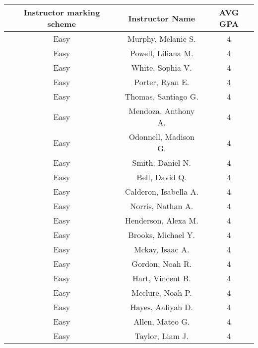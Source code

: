 


\begin{center}
\begin{tabular}{|c|c|c|}
\hline
Instructor marking scheme & Instructor Name  & AVG GPA \\ \hline
Easy     & Murphy, Melanie S.                             & 4        \\ \hline
Easy     & Powell, Liliana M.                           &4        \\ \hline
Easy     &  White, Sophia V.                        &4 \\ \hline
Easy     & Porter, Ryan E.                          &4    \\ \hline
Easy     & Thomas, Santiago G.                       &4      \\ \hline
Easy     & Mendoza, Anthony A.                        &4         \\ \hline
Easy     & Odonnell, Madison G.                     &4              \\ \hline
Easy     & Smith, Daniel N.                          &4       \\ \hline
Easy     & Bell, David Q.                          &4\\ \hline
Easy       &Calderon, Isabella A.                      &4             \\ \hline
Easy       & Norris, Nathan A.                          &4           \\ \hline
Easy       & Henderson, Alexa M.                      &4           \\ \hline
Easy       & Brooks, Michael Y.                        &4        \\ \hline
Easy       & Mckay, Isaac A.                            &4    \\ \hline
Easy       & Gordon, Noah R.                          &4         \\ \hline
Easy       & Hart, Vincent B.                          &4       \\ \hline
Easy       & Mcclure, Noah P.                           &4                                 \\ \hline
Easy       & Hayes, Aaliyah D.                          &4          \\ \hline
Easy       & Allen, Mateo G.                          &4      \\ \hline
Easy       & Taylor, Liam J.                            &4      \\ \hline

\end{tabular}
\end{center}
